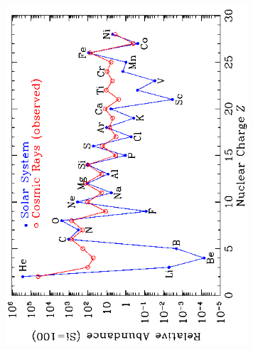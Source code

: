 \documentclass[10pt,a5paper,twoside]{book}
\begin{document}
\begin{figure}[!htbp]
	\begin{center}
  		\includegraphics*[width=9cm]{abs_cr_sol.png}
  	\end{center}
\end{figure}














\end{document}
